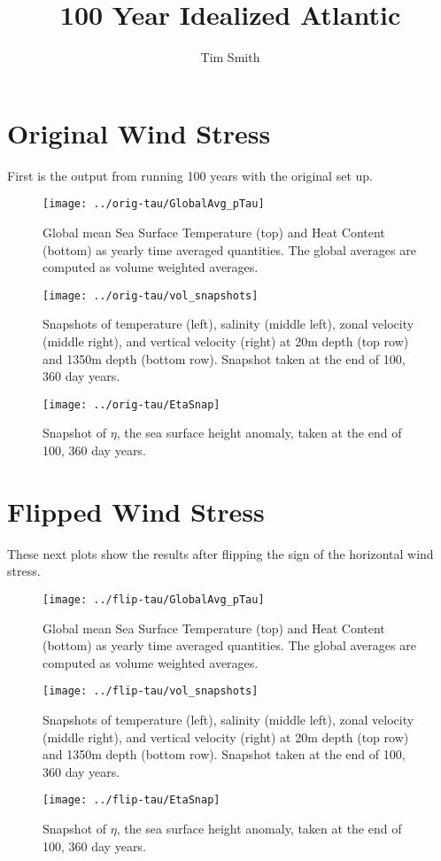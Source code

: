 \documentclass[a4paper,11pt]{article}
\title{\vspace{-10ex}100 Year Idealized Atlantic}
\author{Tim Smith}
\date{\vspace{-3ex}}
\begin{document}
 

\section{Original Wind Stress}
	First is the output from running 100 years with the original set up. 

\begin{figure}
\centering
\texttt{[image: ../orig-tau/GlobalAvg\_pTau]}
\caption{Global mean Sea Surface Temperature (top) and Heat Content (bottom) as yearly time averaged quantities. The global averages are computed as volume weighted averages.}
\label{fig:globalAvgs}
\end{figure}

\begin{figure}
\centering
\texttt{[image: ../orig-tau/vol\_snapshots]}
\caption{Snapshots of temperature (left), salinity (middle left), zonal velocity (middle right), and vertical velocity (right) at 20m depth (top row) and 1350m depth (bottom row). Snapshot taken at the end of 100, 360 day years.}
\label{fig:volSnaps}
\end{figure}

\begin{figure}
\centering
\texttt{[image: ../orig-tau/EtaSnap]}
\caption{Snapshot of $\eta$, the sea surface height anomaly, taken at the end of 100, 360 day years.} 
\label{fig:etaSnap}
\end{figure}

\section{Flipped Wind Stress}

	These next plots show the results after flipping the sign of the horizontal wind stress. 

\begin{figure}
\centering
\texttt{[image: ../flip-tau/GlobalAvg\_pTau]}
\caption{Global mean Sea Surface Temperature (top) and Heat Content (bottom) as yearly time averaged quantities. The global averages are computed as volume weighted averages.}
\label{fig:flipGlobalAvgs}
\end{figure}

\begin{figure}
\centering
\texttt{[image: ../flip-tau/vol\_snapshots]}
\caption{Snapshots of temperature (left), salinity (middle left), zonal velocity (middle right), and vertical velocity (right) at 20m depth (top row) and 1350m depth (bottom row). Snapshot taken at the end of 100, 360 day years.}
\label{fig:flipVolSnaps}
\end{figure}

\begin{figure}
\centering
\texttt{[image: ../flip-tau/EtaSnap]}
\caption{Snapshot of $\eta$, the sea surface height anomaly, taken at the end of 100, 360 day years.} 
\label{fig:flipEtaSnap}
\end{figure}
\end{document}
